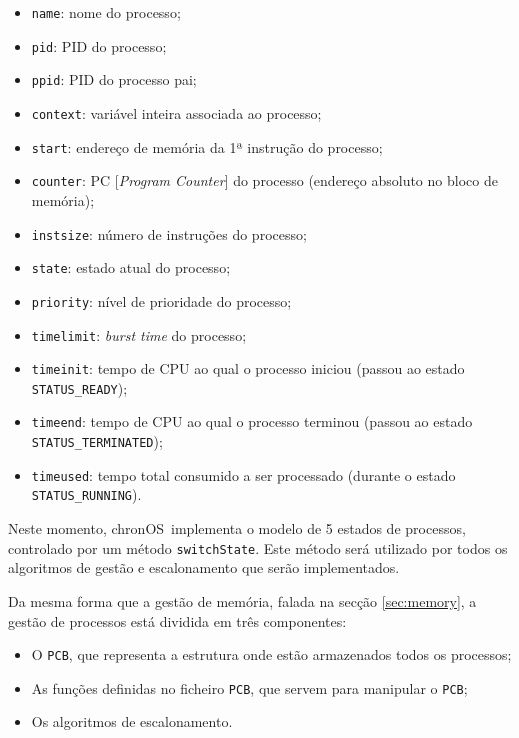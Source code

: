 \documentclass[10pt,oneside]{estiloUBI}
\newcommand{\chronOS}{\textsf{chronOS}}
\begin{document}
	\begin{itemize}
		\item \verb|name|: nome do processo;
		\item \verb|pid|: \ac{PID} do processo;
		\item \verb|ppid|: \ac{PID} do processo pai;
		\item \verb|context|: variável inteira associada ao processo;
		\item \verb|start|: endereço de memória da 1ª instrução do processo;
		\item \verb|counter|: PC [\textit{Program Counter}] do processo (endereço absoluto no bloco de memória);
		\item \verb|instsize|: número de instruções do processo;
		\item \verb|state|: estado atual do processo;
		\item \verb|priority|: nível de prioridade do processo;
		\item \verb|timelimit|: \textit{burst time} do processo;
		\item \verb|timeinit|: tempo de \ac{CPU} ao qual o processo iniciou (passou ao estado \texttt{STATUS\_READY});
		\item \verb|timeend|: tempo de \ac{CPU} ao qual o processo terminou (passou ao estado \texttt{STATUS\_TERMINATED});
		\item \verb|timeused|: tempo total consumido a ser processado (durante o estado \texttt{STATUS\_RUNNING}).
	\end{itemize}
	
	Neste momento, \chronOS~implementa o modelo de 5 estados de processos, controlado por um método \verb|switchState|. Este método será utilizado por todos os algoritmos de gestão e escalonamento que serão implementados.
	
	Da mesma forma que a gestão de memória, falada na secção \ref{sec:memory}, a gestão de processos está dividida em três componentes:
	
	\begin{itemize} %
	    \item O \texttt{\ac{PCB}}, que representa a estrutura onde estão armazenados todos os processos;
	    \item As funções definidas no ficheiro \texttt{\ac{PCB}}, que servem para manipular o \texttt{\ac{PCB}};
	    \item Os algoritmos de escalonamento.
	\end{itemize}  
	
\end{document}
